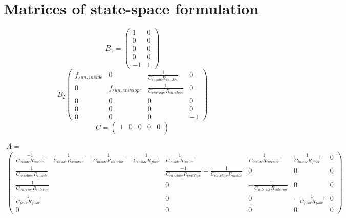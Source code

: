 \section{Matrices of state-space formulation}
\label{sec:appendix:Matrizen}
    
    \begin{equation}
    B_1 = 
    \begin{pmatrix}
        1 & 0 \\
        0 & 0 \\
        0 & 0 \\
        0 & 0 \\
        -1 & 1 
    \end{pmatrix}
    \end{equation}
    \begin{equation}
	B_2
	\begin{pmatrix}
         f_{sun,inside} & 0 & \frac{1}{C_{inside}R_{window}} & 0\\
         0 & f_{sun,envelope} & \frac{1}{C_{envelope}R_{envelope}}&0\\
         0 & 0 & 0& 0\\
         0 & 0 & 0& 0\\
         0 & 0 & 0 & -1
    \end{pmatrix}
	\end{equation}
	\begin{equation}
	    C = 
	    \begin{pmatrix}
        1 & 0 & 0 & 0 & 0 \\
        \end{pmatrix}
	\end{equation}
	\begin{landscape}
	\begin{align} 
	A = \nonumber \\ 
	\begin{pmatrix}
    \frac{-1}{C_{inside}R_{inside}}-\frac{1}{C_{inside}R_{window}}-\frac{1}{C_{inside}R_{interior}}-\frac{1}{C_{inside}R_{floor}}   & \frac{1}{C_{inside}R_{inside}} & \frac{1}{C_{inside}R_{interior}} & \frac{1}{C_{inside}R_{floor}} & 0 \\
    \frac{1}{C_{envelope}R_{inside}}& \frac{-1}{C_{envelope}R_{envelope}}- \frac{1}{C_{envelope}R_{inside}} & 0 & 0 & 0 \\
    \frac{1}{C_{interior}R_{interior}} & 0 & -\frac{1}{C_{interior}R_{interior}} & 0 &0 \\
    \frac{1}{C_{floor}R_{floor}} & 0 & 0 & -\frac{1}{C_{floor}R_{floor}} &0 \\
    0 & 0 & 0 & 0 & 0
    \end{pmatrix} \nonumber\\ 
    \end{align}
    \end{landscape}

